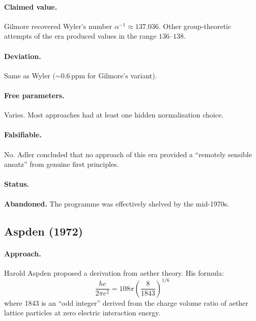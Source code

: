 \documentclass[11pt,a4paper]{article}
\begin{document}
\paragraph{Claimed value.}
Gilmore recovered Wyler's number $\alpha^{-1}\approx 137.036$.
Other group-theoretic attempts of the era produced values in the range $136$--$138$.

\paragraph{Deviation.}
Same as Wyler ($\sim 0.6$\,ppm for Gilmore's variant).

\paragraph{Free parameters.}
Varies.  Most approaches had at least one hidden normalisation choice.

\paragraph{Falsifiable.}
No.  Adler concluded that no approach of this era provided a ``remotely sensible ansatz'' from genuine first principles.

\paragraph{Status.}
\textbf{Abandoned.}  The programme was effectively shelved by the mid-1970s.

\subsection{Aspden (1972)}\label{sec:aspden}

\paragraph{Approach.}
Harold Aspden proposed a derivation from aether theory.  His formula:
\begin{equation}
\frac{hc}{2\pi e^2} = 108\pi\left(\frac{8}{1843}\right)^{1/6}
\end{equation}
where 1843 is an ``odd integer'' derived from the charge volume ratio of aether lattice particles at zero electric interaction energy.
\end{document}
